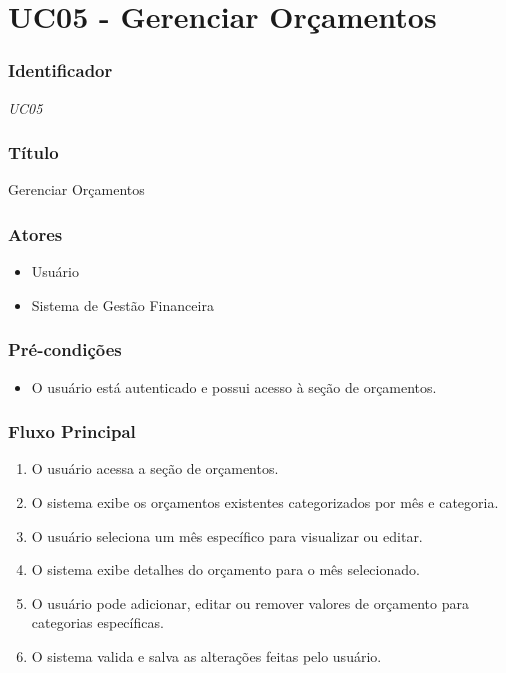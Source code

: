 \chapter{UC05 - Gerenciar Orçamentos}
\label{apendiceUC05}

\subsection*{Identificador}
\textit{UC05}

\subsection*{Título}
Gerenciar Orçamentos

\subsection*{Atores}
\begin{addmargin}[1.5cm]{0cm}
    \begin{itemize}
        \item Usuário
        \item Sistema de Gestão Financeira
    \end{itemize}
\end{addmargin}

\subsection*{Pré-condições}
\begin{addmargin}[1.5cm]{0cm}
    \begin{itemize}
        \item O usuário está autenticado e possui acesso à seção de orçamentos.
    \end{itemize}
\end{addmargin}

\subsection*{Fluxo Principal}
\begin{addmargin}[1.5cm]{0cm}
    \begin{enumerate}
        \item O usuário acessa a seção de orçamentos.
        \item O sistema exibe os orçamentos existentes categorizados por mês e categoria.
        \item O usuário seleciona um mês específico para visualizar ou editar.
        \item O sistema exibe detalhes do orçamento para o mês selecionado.
        \item O usuário pode adicionar, editar ou remover valores de orçamento para categorias específicas.
        \item O sistema valida e salva as alterações feitas pelo usuário.
    \end{enumerate}
\end{addmargin}

